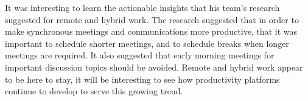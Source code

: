 \documentclass[11pt]{article}
\begin{document}
It was interesting to learn the actionable insights that his team's research suggested for remote and hybrid work. The research suggested that in order to make synchronous meetings and communications more productive, that it was important to schedule shorter meetings, and to schedule breaks when longer meetings are required. It also suggested that early morning meetings for important discussion topics should be avoided. Remote and hybrid work appear to be here to stay, it will be interesting to see how productivity platforms continue to develop to serve this growing trend.\\
\end{document}
